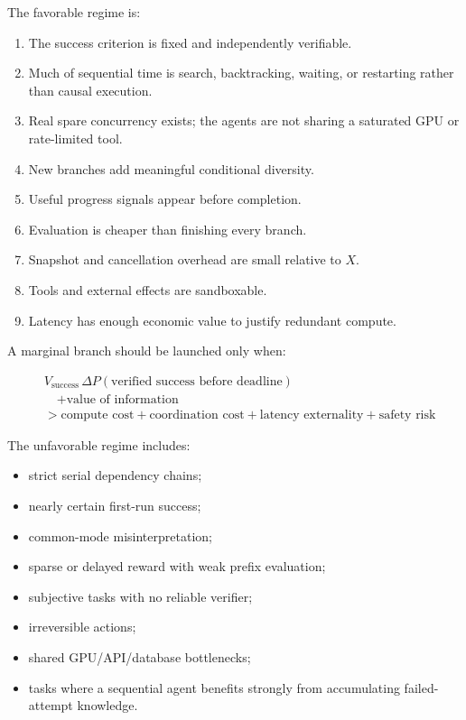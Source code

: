 \documentclass[
  letterpaper,
]{article}
\providecommand{\tightlist}{%
  \setlength{\itemsep}{0pt}\setlength{\parskip}{0pt}}
\begin{document}
The favorable regime is:

\begin{enumerate}
\def\labelenumi{\arabic{enumi}.}
\tightlist
\item
  The success criterion is fixed and independently verifiable.
\item
  Much of sequential time is search, backtracking, waiting, or restarting rather than causal execution.
\item
  Real spare concurrency exists; the agents are not sharing a saturated GPU or rate-limited tool.
\item
  New branches add meaningful conditional diversity.
\item
  Useful progress signals appear before completion.
\item
  Evaluation is cheaper than finishing every branch.
\item
  Snapshot and cancellation overhead are small relative to \(X\).
\item
  Tools and external effects are sandboxable.
\item
  Latency has enough economic value to justify redundant compute.
\end{enumerate}

A marginal branch should be launched only when:

\[
\begin{aligned}
&V_{\text{success}}\,
\Delta P(\text{verified success before deadline})\\
&\quad+\text{value of information}\\
&>
\text{compute cost}
+\text{coordination cost}
+\text{latency externality}
+\text{safety risk}
\end{aligned}
\]

The unfavorable regime includes:

\begin{itemize}
\tightlist
\item
  strict serial dependency chains;
\item
  nearly certain first-run success;
\item
  common-mode misinterpretation;
\item
  sparse or delayed reward with weak prefix evaluation;
\item
  subjective tasks with no reliable verifier;
\item
  irreversible actions;
\item
  shared GPU/API/database bottlenecks;
\item
  tasks where a sequential agent benefits strongly from accumulating failed-attempt knowledge.
\end{itemize}
\end{document}
